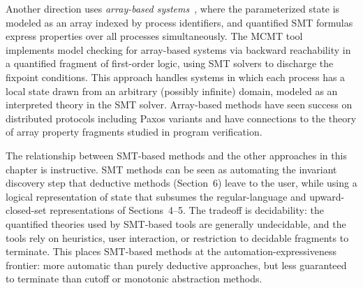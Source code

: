 Another direction uses \emph{array-based systems}~\cite{GS10}, where the
parameterized state is modeled as an array indexed by process identifiers,
and quantified SMT formulas express properties over all processes
simultaneously. The MCMT tool~\cite{GS10} implements model checking for
array-based systems via backward reachability in a quantified fragment of
first-order logic, using SMT solvers to discharge the fixpoint conditions.
This approach handles systems in which each process has a local state drawn
from an arbitrary (possibly infinite) domain, modeled as an interpreted theory
in the SMT solver. Array-based methods have seen success on distributed
protocols including Paxos variants and have connections to the theory of
array property fragments studied in program verification.

The relationship between SMT-based methods and the other approaches in this
chapter is instructive. SMT methods can be seen as automating the invariant
discovery step that deductive methods (Section~6) leave to the user, while
using a logical representation of state that subsumes the regular-language
and upward-closed-set representations of Sections~4--5. The tradeoff is
decidability: the quantified theories used by SMT-based tools are generally
undecidable, and the tools rely on heuristics, user interaction, or
restriction to decidable fragments to terminate. This places SMT-based methods
at the automation-expressiveness frontier: more automatic than purely deductive
approaches, but less guaranteed to terminate than cutoff or monotonic
abstraction methods.
